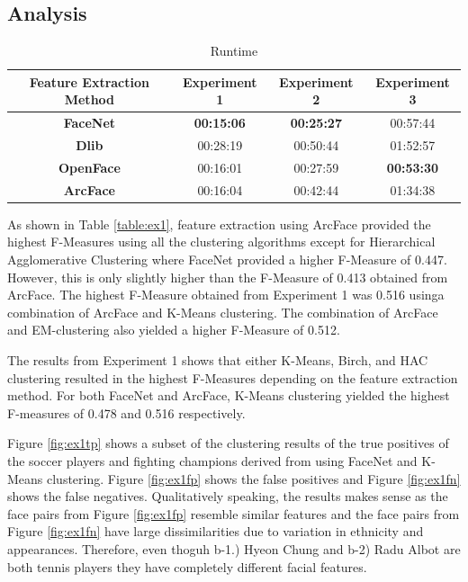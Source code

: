 \documentclass[12pt,english]{article}
\begin{document}
\subsection{Analysis}

\begin{table}[h!]
\centering
\begin{tabular}{||c c c c||} 
 \hline
Feature Extraction Method & Experiment 1 & Experiment 2 & Experiment 3\\ [0.5ex]
 \hline\hline
 \textbf{FaceNet} & \textbf{00:15:06} & \textbf{00:25:27} & 00:57:44\\ 
 \hline
  \textbf{Dlib} & 00:28:19 & 00:50:44 & 01:52:57\\
 \hline
 \textbf{OpenFace} & 00:16:01 & 00:27:59 & \textbf{00:53:30}\\
 \hline
 \textbf{ArcFace} & 00:16:04 & 00:42:44 & 01:34:38\\
 \hline
\end{tabular}
\caption{Runtime}
\label{table:runtime}
\end{table}

As shown in Table \ref{table:ex1}, feature extraction using ArcFace provided the highest F-Measures using all the clustering algorithms except for Hierarchical Agglomerative Clustering where FaceNet provided a higher F-Measure of 0.447. However, this is only slightly higher than the F-Measure of 0.413 obtained from ArcFace. The highest F-Measure obtained from Experiment 1 was 0.516 usinga combination of ArcFace and K-Means clustering. The combination of ArcFace and EM-clustering also yielded a higher F-Measure of 0.512. 

The results from Experiment 1 shows that either K-Means, Birch, and HAC clustering resulted in the highest F-Measures depending on the feature extraction method. For both FaceNet and ArcFace, K-Means clustering yielded the highest F-measures of 0.478 and 0.516 respectively. 

Figure \ref{fig:ex1tp} shows a subset of the clustering results of the true positives of the soccer players and fighting champions derived from using FaceNet and K-Means clustering.  Figure \ref{fig:ex1fp} shows the false positives and Figure \ref{fig:ex1fn} shows the false negatives. Qualitatively speaking, the results makes sense as the face pairs from Figure \ref{fig:ex1fp} resemble similar features and the face pairs from Figure \ref{fig:ex1fn} have large dissimilarities due to variation in ethnicity and appearances. Therefore, even thoguh b-1.) Hyeon Chung and b-2) Radu Albot are both tennis players they have completely different facial features.
\end{document}
